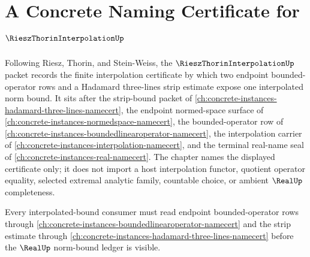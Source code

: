 \chapter{A Concrete Naming Certificate for $\RieszThorinInterpolationUp$}
\label{ch:concrete-instances-riesz-thorin-interpolation-namecert}

Following Riesz, Thorin, and Stein-Weiss, the $\RieszThorinInterpolationUp$ packet records the finite interpolation certificate by which two endpoint bounded-operator rows and a Hadamard three-lines strip estimate expose one interpolated norm bound. It sits after the strip-bound packet of \autoref{ch:concrete-instances-hadamard-three-lines-namecert}, the endpoint normed-space surface of \autoref{ch:concrete-instances-normedspace-namecert}, the bounded-operator row of \autoref{ch:concrete-instances-boundedlinearoperator-namecert}, the interpolation carrier of \autoref{ch:concrete-instances-interpolation-namecert}, and the terminal real-name seal of \autoref{ch:concrete-instances-real-namecert}. The chapter names the displayed certificate only; it does not import a host interpolation functor, quotient operator equality, selected extremal analytic family, countable choice, or ambient $\RealUp$ completeness.

Every interpolated-bound consumer must read endpoint bounded-operator rows through \autoref{ch:concrete-instances-boundedlinearoperator-namecert} and the strip estimate through \autoref{ch:concrete-instances-hadamard-three-lines-namecert} before the $\RealUp$ norm-bound ledger is visible.

